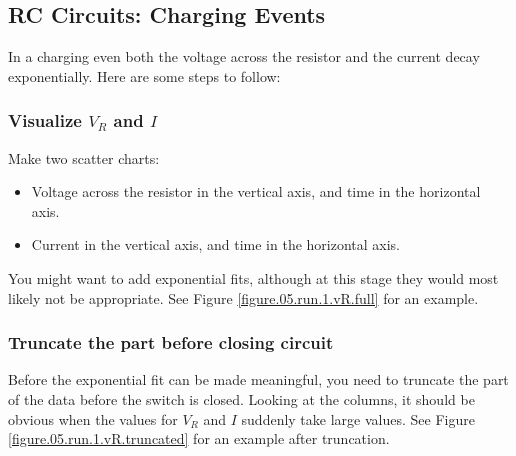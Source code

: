 \subsection{RC Circuits: Charging Events}
In a charging even both the voltage across the resistor and the current decay exponentially. Here are some steps to follow:
\subsubsection{Visualize $V_{R}$ and $I$}
Make two scatter charts:
\begin{itemize}
    \item Voltage across the resistor in the vertical axis, and time in the horizontal axis.
    \item Current in the vertical axis, and time in the horizontal axis.
\end{itemize}
You might want to add exponential fits, although at this stage they would most likely not be appropriate. See Figure \ref{figure.05.run.1.vR.full} for an example.
\subsubsection{Truncate the part before closing circuit}
Before the exponential fit can be made meaningful, you need to truncate the part of the data before the switch is closed. Looking at the columns, it should be obvious when the values for $V_{R}$ and $I$ suddenly take large values. See Figure \ref{figure.05.run.1.vR.truncated} for an example after truncation.
